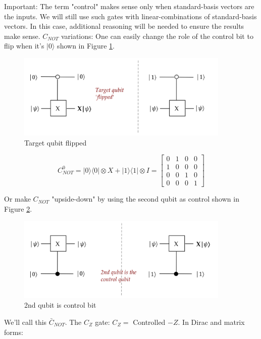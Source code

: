 \documentclass[main.tex]{subfiles}
\begin{document}
    Important: The term "control" makes sense only when standard-basis vectors are the inputs. We will still use such gates with linear-combinations of standard-basis vectors. In this case, additional reasoning will be needed to ensure the results make sense. $C_{NOT}$ variations: One can easily change the role of the control bit to flip when it's $|0\rangle$ shown in Figure \ref{fig:19cnot3}.
    
    \begin{figure}
        \centering
        \includegraphics[width=4in]{notes/figs/n08/19cnot3.png}
        \caption{Target qubit flipped}
        \label{fig:19cnot3}
    \end{figure}
    
    $$
    C_{NOT}^{0}=|0\rangle\langle 0|\otimes X+| 1\rangle\langle 1| \otimes I=\left[\begin{array}{llll}
    0 & 1 & 0 & 0 \\
    1 & 0 & 0 & 0 \\
    0 & 0 & 1 & 0 \\
    0 & 0 & 0 & 1
    \end{array}\right]
    $$

    Or make $C_{NOT}$ "upside-down" by using the second qubit as control shown in Figure \ref{fig:20cnot4}.
    
    \begin{figure}
        \centering
        \includegraphics[width=4in]{notes/figs/n08/20cnot4.png}
        \caption{2nd qubit is control bit}
        \label{fig:20cnot4}
    \end{figure}
    
    We'll call this $\bar{C}_{NOT}$. The $C_{Z}$ gate: $C_{Z}=$ Controlled $-Z$. In Dirac and matrix forms:
    
\end{document}

